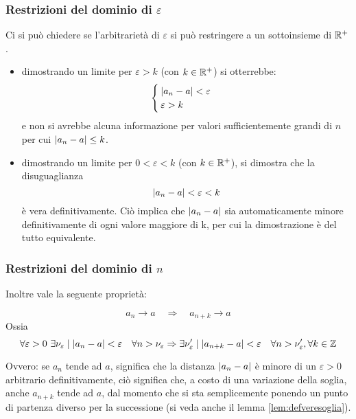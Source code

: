 \subsubsection{Restrizioni del dominio di $\varepsilon$}
Ci si può chiedere se l'arbitrarietà di $\varepsilon$ si può restringere a un sottoinsieme di $\mathbb{R}^+$.
\begin{itemize}
	\item dimostrando un limite per $\varepsilon>k$ (con $k\in\mathbb{R}^+$) si otterrebbe:
	      \[
		      \begin{cases}
			      \left\lvert a_n-a \right\rvert<\varepsilon \\
			      \varepsilon>k
		      \end{cases}
	      \]
	      e non si avrebbe alcuna informazione per valori sufficientemente grandi di $n$ per cui $\left\lvert a_n-a \right\rvert\leq k$.
	\item dimostrando un limite per $0<\varepsilon<k$ (con $k\in\mathbb{R}^+$), si dimostra che la disuguaglianza
	      \[
		      \left\lvert a_n-a \right\rvert<\varepsilon<k
	      \]
	      è vera definitivamente. Ciò implica che $\left\lvert a_n-a \right\rvert$ sia automaticamente minore definitivamente di ogni valore maggiore di k, per cui la dimostrazione è del tutto equivalente.
\end{itemize}

\subsubsection{Restrizioni del dominio di $n$}
Inoltre vale la seguente proprietà:
\begin{prop}
	\label{suc:trasl}
	\begin{equation}
		a_n\to a \quad\Rightarrow\quad a_{n+k}\to a
	\end{equation}
	Ossia
	\begin{equation*}
		\forall\varepsilon>0~\exists\nu_\varepsilon\mid\left\lvert a_n-a \right\rvert<\varepsilon\quad\forall n>\nu_\varepsilon \Rightarrow \exists\nu'_\varepsilon\mid\left\lvert a_{n+k}-a \right\rvert<\varepsilon\quad\forall n>\nu'_\varepsilon,\forall k\in\mathbb{Z}
	\end{equation*}
\end{prop}
Ovvero: se $a_n$ tende ad $a$, significa che la distanza $\left\lvert a_n-a \right\rvert$ è minore di un $\varepsilon>0$ arbitrario definitivamente, ciò significa che, a costo di una variazione della soglia, anche $a_{n+k}$ tende ad $a$, dal momento che si sta semplicemente ponendo un punto di partenza diverso per la successione (si veda anche il lemma \ref{lem:defveresoglia}).

